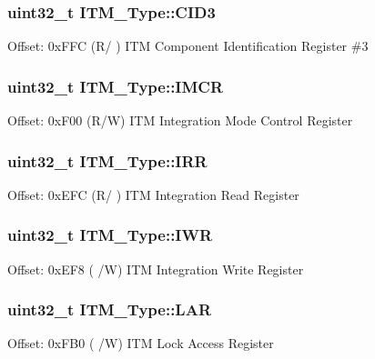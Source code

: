 \subsubsection[{\texorpdfstring{C\+I\+D3}{CID3}}]{ uint32\+\_\+t I\+T\+M\+\_\+\+Type\+::\+C\+I\+D3}\hypertarget{struct_i_t_m___type_a0e7aa199619cc7ac6baddff9600aa52e}{}\label{struct_i_t_m___type_a0e7aa199619cc7ac6baddff9600aa52e}
Offset\+: 0x\+F\+FC (R/ ) I\+TM Component Identification Register \#3 
\subsubsection[{\texorpdfstring{I\+M\+CR}{IMCR}}]{ uint32\+\_\+t I\+T\+M\+\_\+\+Type\+::\+I\+M\+CR}\hypertarget{struct_i_t_m___type_ab2e87d8bb0e3ce9b8e0e4a6a6695228a}{}\label{struct_i_t_m___type_ab2e87d8bb0e3ce9b8e0e4a6a6695228a}
Offset\+: 0x\+F00 (R/W) I\+TM Integration Mode Control Register 
\subsubsection[{\texorpdfstring{I\+RR}{IRR}}]{ uint32\+\_\+t I\+T\+M\+\_\+\+Type\+::\+I\+RR}\hypertarget{struct_i_t_m___type_a212a614a8d5f2595e5eb049e5143c739}{}\label{struct_i_t_m___type_a212a614a8d5f2595e5eb049e5143c739}
Offset\+: 0x\+E\+FC (R/ ) I\+TM Integration Read Register 
\subsubsection[{\texorpdfstring{I\+WR}{IWR}}]{ uint32\+\_\+t I\+T\+M\+\_\+\+Type\+::\+I\+WR}\hypertarget{struct_i_t_m___type_afd0e0c051acd3f6187794a4e8dc7e7ea}{}\label{struct_i_t_m___type_afd0e0c051acd3f6187794a4e8dc7e7ea}
Offset\+: 0x\+E\+F8 ( /W) I\+TM Integration Write Register 
\subsubsection[{\texorpdfstring{L\+AR}{LAR}}]{ uint32\+\_\+t I\+T\+M\+\_\+\+Type\+::\+L\+AR}\hypertarget{struct_i_t_m___type_a97840d39a9c63331e3689b5fa69175e9}{}\label{struct_i_t_m___type_a97840d39a9c63331e3689b5fa69175e9}
Offset\+: 0x\+F\+B0 ( /W) I\+TM Lock Access Register 
